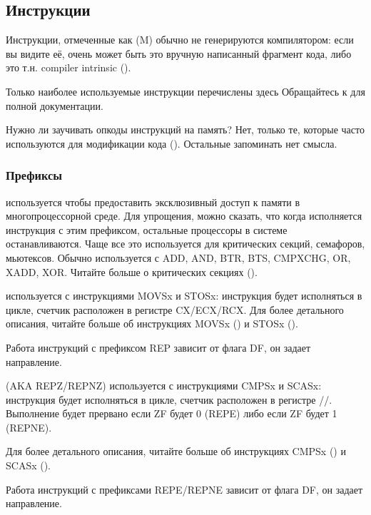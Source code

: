 \subsection{Инструкции}
\label{sec:x86_instructions}

Инструкции, отмеченные как (M) обычно не генерируются компилятором: если вы видите её, очень может быть
это вручную написанный фрагмент кода, либо это т.н. compiler intrinsic
().


Только наиболее используемые инструкции перечислены здесь
Обращайтесь к  для полной документации.

Нужно ли заучивать опкоды инструкций на память?
Нет, только те, которые часто используются для модификации кода
().
Остальные запоминать нет смысла.

\subsubsection{Префиксы}

\begin{description}
\label{x86_lock}
\item[LOCK] используется чтобы предоставить эксклюзивный доступ к памяти в многопроцессорной среде.
Для упрощения, можно сказать, что когда исполняется инструкция с этим префиксом, остальные процессоры
в системе останавливаются.
Чаще все это используется для критических секций, семафоров, мьютексов.
Обычно используется с ADD, AND, BTR, BTS, CMPXCHG, OR, XADD, XOR.
Читайте больше о критических секциях ().

\item[REP] используется с инструкциями MOVSx и STOSx:
инструкция будет исполняться в цикле, счетчик расположен в регистре CX/ECX/RCX.
Для более детального описания, читайте больше об инструкциях
MOVSx () и STOSx ().

Работа инструкций с префиксом REP зависит от флага DF, он задает направление.

\item[REPE/REPNE] (\ac{AKA} REPZ/REPNZ) используется с инструкциями CMPSx и
SCASx:
инструкция будет исполняться в цикле, счетчик расположен в регистре //.
Выполнение будет прервано если ZF будет 0 (REPE) либо если ZF будет 1 (REPNE).

Для более детального описания, читайте больше об инструкциях CMPSx () 
и SCASx ().

Работа инструкций с префиксами REPE/REPNE зависит от флага DF, он задает направление.

\end{description}

